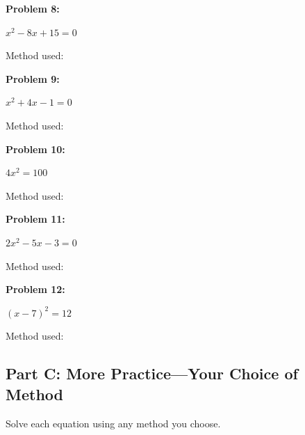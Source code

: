 \documentclass[12pt]{article}
\begin{document}
			\textbf{Problem 8:}
            
            $x^2 - 8x + 15 = 0$

			\vspace{3.7cm}

			Method used: \underline{\hspace{2in}}

			\vspace{1cm}

			\textbf{Problem 9:}
            
            $x^2 + 4x - 1 = 0$

			\vspace{3.7cm}

			Method used: \underline{\hspace{2in}}

			\newpage

			\textbf{Problem 10:}
            
            $4x^2 = 100$

			\vspace{4cm}

			Method used: \underline{\hspace{2in}}

			\vspace{1cm}

			\textbf{Problem 11:}
            
            $2x^2 - 5x - 3 = 0$

			\vspace{5cm}

			Method used: \underline{\hspace{2in}}

			\vspace{1cm}

			\textbf{Problem 12:}
            
            $(x - 7)^2 = 12$

			\vspace{4cm}

			Method used: \underline{\hspace{2in}}

			\newpage

		\subsection*{Part C: More Practice—Your Choice of Method}

			Solve each equation using any method you choose.\\
\end{document}
